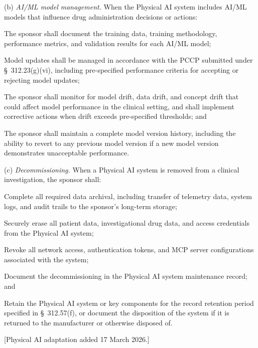 \documentclass[11pt]{article}
\begin{document}
(b) \textit{AI/ML model management.} When the Physical AI system includes AI/ML models that influence drug administration decisions or actions:

\begin{description}[leftmargin=0.8cm,style=sameline]
\item[(1)] The sponsor shall document the training data, training methodology, performance metrics, and validation results for each AI/ML model;
\item[(2)] Model updates shall be managed in accordance with the PCCP submitted under \S~312.23(g)(vi), including pre-specified performance criteria for accepting or rejecting model updates;
\item[(3)] The sponsor shall monitor for model drift, data drift, and concept drift that could affect model performance in the clinical setting, and shall implement corrective actions when drift exceeds pre-specified thresholds; and
\item[(4)] The sponsor shall maintain a complete model version history, including the ability to revert to any previous model version if a new model version demonstrates unacceptable performance.
\end{description}

(c) \textit{Decommissioning.} When a Physical AI system is removed from a clinical investigation, the sponsor shall:

\begin{description}[leftmargin=0.8cm,style=sameline]
\item[(1)] Complete all required data archival, including transfer of telemetry data, system logs, and audit trails to the sponsor's long-term storage;
\item[(2)] Securely erase all patient data, investigational drug data, and access credentials from the Physical AI system;
\item[(3)] Revoke all network access, authentication tokens, and MCP server configurations associated with the system;
\item[(4)] Document the decommissioning in the Physical AI system maintenance record; and
\item[(5)] Retain the Physical AI system or key components for the record retention period specified in \S~312.57(f), or document the disposition of the system if it is returned to the manufacturer or otherwise disposed of.
\end{description}

[Physical AI adaptation added 17 March 2026.]
\end{document}
